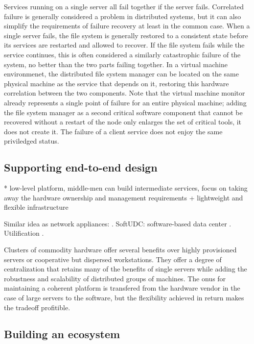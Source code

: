 Services running on a single server all fail together if the server fails. Correlated failure is generally considered a problem in distributed systems, but it can also simplify the requirements of failure recovery at least in the common case. When a single server fails, the file system is generally restored to a consistent state before its services are restarted and allowed to recover. If the file system fails while the service continues, this is often considered a similarly catastrophic failure of the system, no better than the two parts failing together. In a virtual machine environmenet, the distributed file system manager can be located on the same physical machine as the service that depends on it, restoring this hardware correlation between the two components. Note that the virtual machine monitor already represents a single point of failure for an entire physical machine; adding the file system manager as a second critical software component that cannot be recovered without a restart of the node only enlarges the set of critical tools, it does not create it. The failure of a client service does not enjoy the same priviledged status.

\subsection{Supporting end-to-end design}

* low-level platform, middle-men can build intermediate services, focus on taking away the hardware ownership and management requirements + lightweight and flexible infrastructure

Similar idea as network appliances: \cite{sapuntzakis03}. SoftUDC: software-based data center \cite{kallahalla}. Utilification \cite{wilkes04}.

Clusters of commodity hardware offer several benefits over highly provisioned servers or cooperative but dispersed workstations. They offer a degree of centralization that retains many of the benefits of single servers while adding the robustness and scalability of distributed groups of machines. The onus for maintaining a coherent platform is transfered from the hardware vendor in the case of large servers to the software, but the flexibility achieved in return makes the tradeoff profitible.

\subsection{Building an ecosystem}

